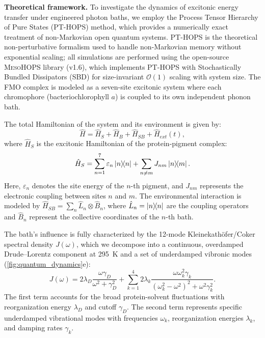 \documentclass[journal=jpcl,manuscript=letter]{achemso}
\begin{document}
\textbf{Theoretical framework.}
To investigate the dynamics of excitonic energy transfer under engineered photon baths, we employ the Process Tensor Hierarchy of Pure States (PT-HOPS) method,\cite{Suess2014,Citty2024a} which provides a numerically exact treatment of non-Markovian open quantum systems. PT-HOPS is the theoretical non-perturbative formalism used to handle non-Markovian memory without exponential scaling; all simulations are performed using the open-source \textsc{MesoHOPS} library (v1.6),\cite{Varvelo2021a} which implements PT-HOPS with Stochastically Bundled Dissipators (SBD) for size-invariant $\mathcal{O}(1)$ scaling with system size. The FMO complex is modeled as a seven-site excitonic system where each chromophore (bacteriochlorophyll $a$) is coupled to its own independent phonon bath.

The total Hamiltonian of the system and its environment is given by:
\begin{equation}
\hat{H} = \hat{H}_S + \hat{H}_B + \hat{H}_{SB} + \hat{H}_{ext}(t),
\label{eq:total_hamiltonian}
\end{equation}
where $\hat{H}_S$ is the excitonic Hamiltonian of the protein-pigment complex:
\begin{equation}
\hat{H}_S = \sum_{n=1}^{7} \varepsilon_n \dyad{n} + \sum_{n \neq m} J_{nm} \dyad{n}{m}.
\label{eq:excitonic_hamiltonian}
\end{equation}
Here, $\varepsilon_n$ denotes the site energy of the $n$-th pigment, and $J_{nm}$ represents the electronic coupling between sites $n$ and $m$. The environmental interaction is modeled by $\hat{H}_{SB} = \sum_n \hat{L}_n \otimes \hat{B}_n$, where $\hat{L}_n = \dyad{n}$ are the coupling operators and $\hat{B}_n$ represent the collective coordinates of the $n$-th bath.

The bath's influence is fully characterized by the 12-mode Kleinekathöfer/Coker spectral density $J(\omega)$, which we decompose into a continuous, overdamped Drude--Lorentz component at \SI{295}{\kelvin} and a set of underdamped vibronic modes (\cref{fig:quantum_dynamics}e):
\begin{equation}
J(\omega) = 2\lambda_D \frac{\omega \gamma_D}{\omega^2 + \gamma_D^2} + \sum_{k=1}^4 2\lambda_k \frac{\omega \omega_k^2 \gamma_k}{(\omega_k^2 - \omega^2)^2 + \omega^2 \gamma_k^2}.
\label{eq:spectral_density}
\end{equation}
The first term accounts for the broad protein-solvent fluctuations with reorganization energy $\lambda_D$ and cutoff $\gamma_D$. The second term represents specific underdamped vibrational modes with frequencies $\omega_k$, reorganization energies $\lambda_k$, and damping rates $\gamma_k$.
\end{document}
